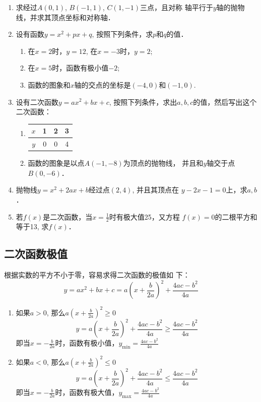 \begin{ex}
\begin{enumerate}
\item 求经过$A(0,1)$, $B(-1,1)$, $C(1,-1)$三点，且对称
    轴平行于$y$轴的抛物线，并求其顶点坐标和对称轴．
    \item 设有函数$y=x^2+px+q$, 按照下列条件，求$p$和$q$的值．
    \begin{enumerate}
 \item 在$x=2$时，$y=12$, 在$x=-3$时，$y=2$;
    \item 在$x=5$时，函数有极小值$-2$;
    \item 函数的图象和$x$轴的交点的坐标是$(-4,0)$和$(-1,
    0)$.
    \end{enumerate}
   
    \item 设有二次函数$y=ax^2+bx+c$, 按照下列条件，求出$a,b,
    c$的值，然后写出这个二次函数：
    \begin{enumerate}
    \item
        \begin{tabular}{c|ccc}
            \hline
$x$&1&2&3\\
            \hline
$y$&0&0&4\\
            \hline
        \end{tabular}
    \item 函数的图象是以点$A(-1,-8)$为顶点的抛物线，
   并且和$y$轴交于点$B(0,-6)$．
    \end{enumerate}

    \item 抛物线$y=x^2+2ax+b$经过点$(2,4)$, 并且其顶点在
    $y-2x-1=0$上，求$a,b$．
    \item 若$f(x)$是二次函数，当$x=\frac{1}{2}$时有极大值25，又方程
    $f(x)=0$的二根平方和等于13, 求$f(x)$．
\end{enumerate} 
\end{ex}

\subsection{二次函数极值}
根据实数的平方不小于零，容易求得二次函数的极值如
下：
\[y=ax^2+bx+c=a\left(x+\frac{b}{2a}\right)^2+\frac{4ac-b^2}{4a}\]
\begin{enumerate}
    \item 如果$a>0$, 那么$a\left(x+\frac{b}{2a}\right)^2\ge 0$
\[y=a\left(x+\frac{b}{2a}\right)^2+\frac{4ac-b^2}{4a}\ge \frac{4ac-b^2}{4a}\]
即当$x=-\frac{b}{2a}$时，函数有极小值，$y_{\min}=\frac{4ac-b^2}{4a}$

\item 如果$a<0$, 那么$a\left(x+\frac{b}{2a} \right)^2\le 0$
\[y=a\left(x+\frac{b}{2a}\right)^2+\frac{4ac-b^2}{4a}\le \frac{4ac-b^2}{4a}\]
即当$x=-\frac{b}{2a}$时，函数有极大值，$y_{\max}=\frac{4ac-b^2}{4a}$
\end{enumerate}

